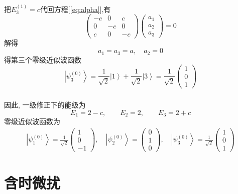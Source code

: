 \begin{frame}
  \frametitle{}
  把$E_{3}^{(1)} = c$代回方程[\ref{eq:alpha}],有 
  \begin{equation*}
    \begin{pmatrix}
      -c & 0 & c \\
      0 & -c & 0 \\
      c & 0 & -c \end{pmatrix}
      \begin{pmatrix}a_{1} \\a_{2} \\ a_{3 } \end{pmatrix} =0
  \end{equation*}
  解得 
  \[ a_{1} =  a_{3} =a, \quad a_{2} =0 \]
  得第三个零级近似波函数
  $$\left\vert \psi ^{(0)}_{3} \right\rangle = \frac{1}{\sqrt{2}} \left\vert 1 \right\rangle + \frac{1}{\sqrt{2}} \left\vert 3 \right\rangle = \frac{1}{\sqrt{2}} \begin{pmatrix}
    1 \\
    0  \\
    1 \end{pmatrix} $$
\end{frame} 

\begin{frame}
  \frametitle{}
因此, 一级修正下的能级为
\[E_{1} = 2-c, \qquad E_{2} = 2, \qquad E_{3} = 2+ c\]
零级近似波函数为
$$
\begin{aligned}
  \left\vert \psi ^{(0)}_{1} \right\rangle  = \frac{1}{\sqrt{2}} \begin{pmatrix}
    1 \\
    0  \\
    -1 \end{pmatrix}, \quad  \left\vert \psi ^{(0)}_{2} \right\rangle  = \begin{pmatrix}
      0 \\
      1  \\
      0 \end{pmatrix},  \quad \left\vert \psi ^{(0)}_{3} \right\rangle  =\frac{1}{\sqrt{2}} \begin{pmatrix}
        1 \\
        0  \\
        1 \end{pmatrix}  
\end{aligned}
$$
\end{frame} 

\section{含时微扰}
